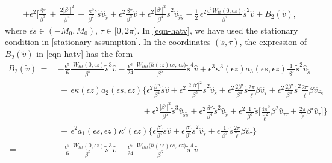 \documentclass[10pt, reqno]{amsart}
\numberwithin{equation}{section}
\theoremstyle{definition}
\begin{document}
{\begin{align}
\nonumber\\[2mm]
&
+\epsilon^2\Big[ \frac{\beta''}{\beta^3}\,+\,\frac{2|\beta'|^2}{\beta^4} \,-\,\frac{\kappa^2}{\beta^2}\Big]{\tilde s} {\hat v}_{\tilde s}
+
\epsilon^2\frac{\beta''}{\beta^3}{\hat v}
+\epsilon^2 \frac{|\beta'|^2}{\beta^4}{\tilde s}^2 {\hat v}_{{\tilde s}{\tilde s}}
-\frac{1}{2}\, \epsilon^2\frac{\epsilon^2W_{tt}(0, \epsilon z)}{\beta^4} {\tilde s}^2 {\hat v}
+B_2 ({\tilde v}),
\label{eqn-hatv}
\end{align}
where $\epsilon {\tilde s}\in(-M_0, M_0),\, \tau\in [0, 2\pi)$.
In \eqref{eqn-hatv}, we have used the stationary condition in \eqref{stationary assumption}.
In the coordinates $(\tilde{s}, \tau)$, the expression of $B_2 ({\tilde v})$ in \eqref{eqn-hatv} has the form
\begin{align}
B_2 ({\tilde v})
\,=\, &
 - \frac{\epsilon^5}{6} \frac{\, \, W_{ttt}(0, \epsilon z)}{\beta^5} {\tilde s}^3{\hat v}
 -\frac{\epsilon^6}{24} \frac{\, \, W_{tttt}\big(\hbar(\epsilon z)\epsilon s, \, \epsilon z\big)}{\beta^6} {\tilde s}^4{\hat v}
 +\epsilon^3 \kappa^3(\epsilon z) a_3(\epsilon s, \epsilon z) \frac{1}{\, \beta^3\, }{\tilde s}^2{\hat v}_{\tilde s}
\nonumber\\[2mm]
&\,+\,
\epsilon \kappa(\epsilon z) a_2(\epsilon s, \epsilon z)
\Bigg\{
\epsilon^2\frac{\beta''} {\beta^4} {\tilde s} {\hat v}
+ \epsilon^2\,\frac{2|\beta'|^2}{\beta^5} {\tilde s}^2 {\hat v}_{\tilde s}
+\epsilon^2 \frac{2\beta'} {\beta^4} {\tilde s}\frac{ 2\pi}{ {\tilde\ell}}\beta{\hat v}_\tau
+ \epsilon^2 \frac{2\beta'}{\beta^4} {\tilde s}^2 \frac{ 2\pi}{ {\tilde\ell}}\beta{\hat v}_{\tau {\tilde s}}
\nonumber\\[2mm]
&\qquad\qquad\qquad\qquad\qquad
+ \epsilon^2 \frac{|\beta'|^2}{\beta^5} {\tilde s}^3{\hat v}_{{\tilde s}{\tilde s}}
+ \epsilon^2 \frac{\beta''}{\beta^4} {\tilde s}^2 {\hat v}_{\tilde s}
 +\epsilon^2 \frac{1}{\, \beta^3\, } {\tilde s}\Bigg[
\frac{ 4\pi^2} {{\tilde\ell}^2} \beta^{2} {\hat v}_{\tau\tau}
+\frac{ 2\pi}{ {\tilde\ell}}\beta' {\hat v}_\tau
\Bigg]
\Bigg\}
\nonumber\\[2mm]
&\,+\,
\epsilon^2a_1(\epsilon s, \epsilon z) \kappa'(\epsilon z)
\Bigg\{
\epsilon\frac{\beta'}{\beta^4} {\tilde s}{\hat v}
+\epsilon\frac{\beta'}{\beta^4} {\tilde s}^2 {\hat v}_{\tilde s}
+\epsilon\frac{1}{\, \beta^3\, } {\tilde s}\frac{ 2\pi}{ {\tilde\ell}}\beta{\hat v}_\tau
\Bigg\}
\nonumber\\[2mm]
\,=\, &
 - \frac{\epsilon^5}{6} \frac{\, \, W_{ttt}(0, \epsilon z)}{\beta^5} {\tilde s}^3{\hat v}
 -\frac{\epsilon^6}{24} \frac{\, \, W_{tttt}\big(\hbar(\epsilon z)\epsilon s, \, \epsilon z\big)}{\beta^6} {\tilde s}^4{\hat v}

\end{align}}
\end{document}
